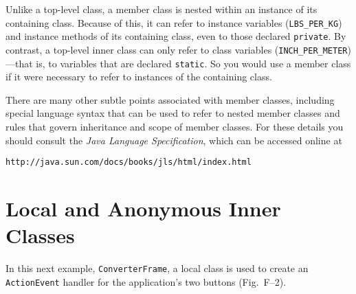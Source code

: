 Unlike a top-level class, a member class is nested within an instance
of its containing class.  Because of this, it can refer to instance
variables (\verb|LBS_PER_KG|) and instance methods of its containing
class, even to those declared {\tt private}. By contrast, a top-level
inner class can only refer to class variables (\verb|INCH_PER_METER|)---that 
is, to variables that are declared {\tt static}. So you would
use a member class if it were necessary to refer to instances of the
containing class.

There are many other subtle points associated with member classes,
including special language syntax that can be used to refer to
nested member classes and rules that govern inheritance and scope
of member classes.  For these details you should consult the
{\it Java Language Specification}, which can be accessed online
at

\begin{jjjlisting}
\begin{lstlisting}[commentstyle=\color{black}]
http://java.sun.com/docs/books/jls/html/index.html
\end{lstlisting}
\end{jjjlisting}


\section*{Local and Anonymous Inner Classes}
\label{localand-anonymous-inner-classes}

In this next example, {\tt ConverterFrame}, a local class is used to
create an {\tt ActionEvent} handler for the application's two buttons
(Fig.~F--2).

